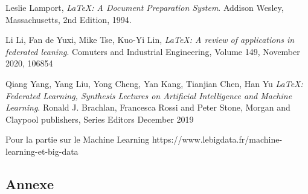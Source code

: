 \documentclass[12pt,a4paper]{report}
\begin{document}
\begin{thebibliography}{9}

	  Leslie Lamport,
	  \emph{\LaTeX: A Document Preparation System}.
	  Addison Wesley, Massachusetts,
	  2nd Edition,
	  1994.
	  
	  Li Li, Fan de Yuxi, Mike Tse, Kuo-Yi Lin,
	  \emph{\LaTeX: A review of applications in federated leaning}.
	  Comuters and Industrial Engineering,
	  Volume 149,
	  November 2020,
	  106854
	  
	  Qiang Yang, Yang Liu, Yong Cheng, Yan Kang, Tianjian Chen, Han Yu
	  \emph{\LaTeX: Federated Learning, Synthesis Lectures on Artificial Intelligence and Machine Learning}.
	  Ronald J. Brachlan, Francesca Rossi and Peter Stone,
	  Morgan and Claypool publishers,
	  Series Editors
	  December 2019
	  
	Pour la partie sur le Machine Learning https://www.lebigdata.fr/machine-learning-et-big-data

\end{thebibliography}


\label{Pour la partie sur le Machine Learning https://www.lebigdata.fr/machine-learning-et-big-data}

\label{TensorFlow : https://www.lebigdata.fr/tensorflow-definition-tout-savoir}

 


\begin{appendix}
 \chapter{Annexe}
 
\end{appendix}
\end{document}
